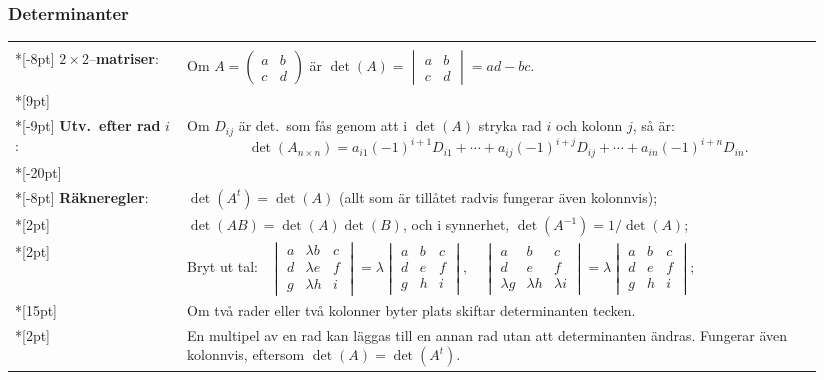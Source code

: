 \documentclass{article}
\begin{document}
\subsubsection*{Determinanter}%
\begin{tabular}{|p{0.2\linewidth}|p{0.745\linewidth}|}
  \hline
   & \\*[-8pt]
   $2\times2$--\textbf{matriser}: &Om $A=\begin{pmatrix}a&b\\c&d\end{pmatrix}$ är 
  $\det(A)=\begin{vmatrix}a&b\\c&d\end{vmatrix}=ad-bc$.
  \\*[9pt] \hline & \\*[-9pt]
  \textbf{Utv.~efter rad} $i$: &
 Om $D_{ij}$ är det.~som fås 
 genom att i $\det(A)$ stryka rad $i$ och kolonn $j$, så är:
  $$
  \det(A_{n\times n})
  = a_{i1}(-1)^{i+1}D_{i1}
  + \cdots + a_{ij}(-1)^{i+j}D_{ij}
  + \cdots + a_{in}(-1)^{i+n}D_{in}.
 $$ 
  \\*[-20pt] \hline & \\*[-8pt]
  \textbf{Räkneregler}: &
  $\det(A^t)=\det(A)$ (allt som är tillåtet radvis fungerar även kolonnvis);
  \\*[2pt]
  &
  $\det(AB)=\det(A)\det(B)$, och i synnerhet, 
  $\det(A^{-1})=1/\det(A)$;
  \\*[2pt]
  &
  Bryt ut tal:
  \ $
  \begin{vmatrix}
    a&\lambda b&c\\d&\lambda e&f\\g&\lambda h&i
  \end{vmatrix}
  =\lambda 
  \begin{vmatrix}
    a&b&c\\d&e&f\\g&h&i
  \end{vmatrix},\quad
  \begin{vmatrix}
    a&b&c\\d&e&f\\\lambda g&\lambda h&\lambda i
  \end{vmatrix}
  =\lambda 
  \begin{vmatrix}
    a&b&c\\d&e&f\\g&h&i
  \end{vmatrix};
  $\\*[15pt]
  &Om två rader eller två kolonner byter plats skiftar determinanten
  tecken.
  \\*[2pt]
  &
  En multipel av en rad kan läggas till en annan rad utan att determinanten ändras.
  Fungerar även kolonnvis, eftersom $\det(A)=\det(A^t)$.
\\
  \hline
\end{tabular}%
\end{document}

